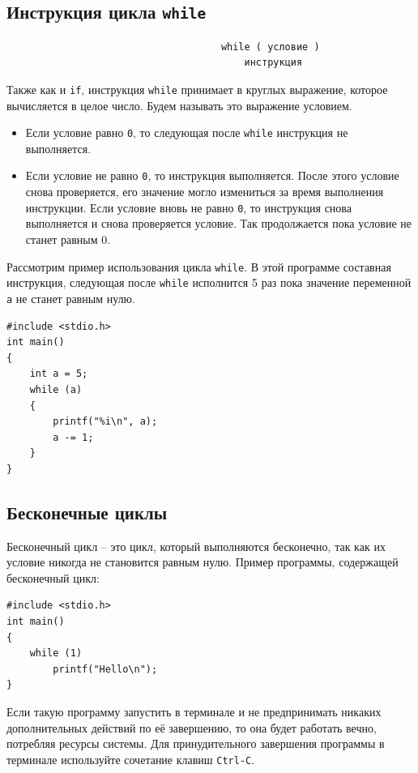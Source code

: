 \documentclass[10pt]{article}
\begin{document}
\subsection*{Инструкция цикла \texttt{while}}
\begin{lstlisting}
                                     while ( условие )
                                         инструкция
\end{lstlisting}
Также как и \texttt{if}, инструкция \texttt{while} принимает в круглых выражение, которое вычисляется в целое число. Будем называть это выражение условием.
\begin{itemize}
\item Если условие равно \texttt{0}, то следующая после \texttt{while} инструкция не выполняется.
\item Если условие не равно \texttt{0}, то инструкция выполняется. После этого условие снова проверяется, его значение могло измениться за время выполнения инструкции.
Если условие вновь не равно \texttt{0}, то инструкция снова выполняется и снова проверяется условие.
Так продолжается пока условие не станет равным 0.
\end{itemize}
Рассмотрим пример использования цикла \texttt{while}. В этой программе составная инструкция, следующая после \texttt{while} исполнится 5 раз пока значение переменной \texttt{a} не станет равным нулю.
\begin{lstlisting}
#include <stdio.h>
int main()
{
    int a = 5;
    while (a)
    {
        printf("%i\n", a);
        a -= 1;
    }
}
\end{lstlisting}


\subsection*{Бесконечные циклы}
Бесконечный цикл -- это цикл, который выполняются бесконечно, так как их условие никогда не становится равным нулю. Пример программы, содержащей бесконечный цикл:
\begin{lstlisting}
#include <stdio.h>
int main()
{
    while (1)
        printf("Hello\n");
}
\end{lstlisting}
Если такую программу запустить в терминале и не предпринимать никаких дополнительных действий по её завершению, то она будет работать вечно, потребляя ресурсы системы. Для принудительного завершения программы в терминале используйте сочетание клавиш \texttt{Ctrl-C}.
\end{document}

